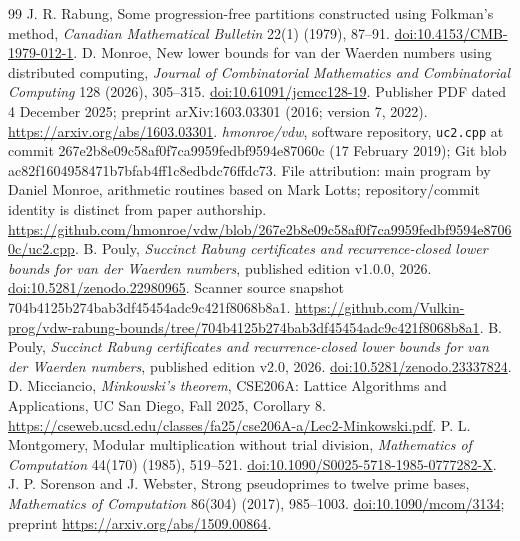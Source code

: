 \documentclass[11pt]{article}
\theoremstyle{definition}\newtheorem{remark}[theorem]{Remark}
\begin{document}
\small
{}
\begin{thebibliography}{99}
J. R. Rabung, Some progression-free partitions constructed using Folkman's
method, \emph{Canadian Mathematical Bulletin} 22(1) (1979), 87--91.
\href{https://doi.org/10.4153/CMB-1979-012-1}{doi:10.4153/CMB-1979-012-1}.
D. Monroe, New lower bounds for van der Waerden numbers using distributed
computing, \emph{Journal of Combinatorial Mathematics and Combinatorial
Computing} 128 (2026), 305--315.
\href{https://doi.org/10.61091/jcmcc128-19}{doi:10.61091/jcmcc128-19}.
Publisher PDF dated 4 December 2025; preprint arXiv:1603.03301 (2016;
version 7, 2022). \url{https://arxiv.org/abs/1603.03301}.
\emph{hmonroe/vdw}, software repository, \texttt{uc2.cpp} at commit
267e2b8e09c58af0f7ca9959fedbf9594e87060c (17 February 2019);
Git blob ac82f1604958471b7bfab4ff1c8edbdc76ffdc73. File attribution:
main program by Daniel Monroe, arithmetic routines based on Mark Lotts;
repository/commit identity is distinct from paper authorship.
\url{https://github.com/hmonroe/vdw/blob/267e2b8e09c58af0f7ca9959fedbf9594e87060c/uc2.cpp}.
B. Pouly, \emph{Succinct Rabung certificates and recurrence-closed lower
bounds for van der Waerden numbers}, published edition v1.0.0, 2026.
\href{https://doi.org/10.5281/zenodo.22980965}{doi:10.5281/zenodo.22980965}.
Scanner source snapshot 704b4125b274bab3df45454adc9c421f8068b8a1.
\url{https://github.com/Vulkin-prog/vdw-rabung-bounds/tree/704b4125b274bab3df45454adc9c421f8068b8a1}.
B. Pouly, \emph{Succinct Rabung certificates and recurrence-closed lower
bounds for van der Waerden numbers}, published edition v2.0, 2026.
\href{https://doi.org/10.5281/zenodo.23337824}{doi:10.5281/zenodo.23337824}.
D. Micciancio, \emph{Minkowski's theorem}, CSE206A: Lattice Algorithms
and Applications, UC San Diego, Fall 2025, Corollary 8.
\url{https://cseweb.ucsd.edu/classes/fa25/cse206A-a/Lec2-Minkowski.pdf}.
P. L. Montgomery, Modular multiplication without trial division,
\emph{Mathematics of Computation} 44(170) (1985), 519--521.
\href{https://doi.org/10.1090/S0025-5718-1985-0777282-X}{doi:10.1090/S0025-5718-1985-0777282-X}.
J. P. Sorenson and J. Webster, Strong pseudoprimes to twelve prime bases,
\emph{Mathematics of Computation} 86(304) (2017), 985--1003.
\href{https://doi.org/10.1090/mcom/3134}{doi:10.1090/mcom/3134};
preprint \url{https://arxiv.org/abs/1509.00864}.

\end{thebibliography}
\end{document}
